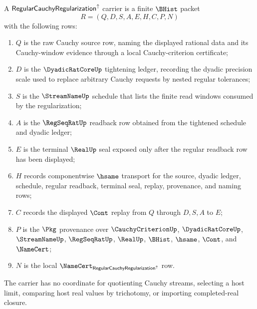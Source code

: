 \begin{definition}
\label{def:regular-cauchy-regularization-carrier}
A $\mathsf{RegularCauchyRegularization}^{\uparrow}$ carrier is a finite $\BHist$ packet
$$
R=(Q,D,S,A,E,H,C,P,N)
$$
with the following rows:
\begin{enumerate}
\item $Q$ is the raw Cauchy source row, naming the displayed rational data and its Cauchy-window evidence through a local Cauchy-criterion certificate;
\item $D$ is the $\DyadicRatCoreUp$ tightening ledger, recording the dyadic precision scale used to replace arbitrary Cauchy requests by nested regular tolerances;
\item $S$ is the $\StreamNameUp$ schedule that lists the finite read windows consumed by the regularization;
\item $A$ is the $\RegSeqRatUp$ readback row obtained from the tightened schedule and dyadic ledger;
\item $E$ is the terminal $\RealUp$ seal exposed only after the regular readback row has been displayed;
\item $H$ records componentwise $\hsame$ transport for the source, dyadic ledger, schedule, regular readback, terminal seal, replay, provenance, and naming rows;
\item $C$ records the displayed $\Cont$ replay from $Q$ through $D,S,A$ to $E$;
\item $P$ is the $\Pkg$ provenance over $\CauchyCriterionUp$, $\DyadicRatCoreUp$, $\StreamNameUp$, $\RegSeqRatUp$, $\RealUp$, $\BHist$, $\hsame$, $\Cont$, and $\NameCert$;
\item $N$ is the local $\NameCert_{\RegularCauchyRegularizationUp}$ row.
\end{enumerate}
The carrier has no coordinate for quotienting Cauchy streams, selecting a host limit, comparing host real values by trichotomy, or importing completed-real closure.
\end{definition}

